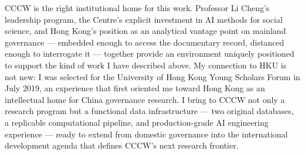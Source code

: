 \documentclass[11pt, letterpaper]{article}
\begin{document}
CCCW is the right institutional home for this work. Professor Li Cheng's leadership
program, the Centre's explicit investment in AI methods for social science, and Hong
Kong's position as an analytical vantage point on mainland governance --- embedded
enough to access the documentary record, distanced enough to interrogate it ---
together provide an environment uniquely positioned to support the kind of work
I have described above. My connection to HKU is not new: I was selected for the
University of Hong Kong Young Scholars Forum in July 2019, an experience that first
oriented me toward Hong Kong as an intellectual home for China governance research.
I bring to CCCW not only a research program but a functional data infrastructure ---
two original databases, a replicable computational pipeline, and production-grade
AI engineering experience --- ready to extend from domestic governance into the
international development agenda that defines CCCW's next research frontier.
\end{document}
